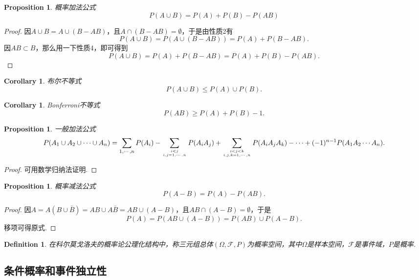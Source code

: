 \documentclass{article}
\newtheorem{corollary}[theorem]{Corollary}
\newtheorem{proposition}[theorem]{Proposition}
\newtheorem{definition}[theorem]{Definition}
\begin{document}
\begin{proposition}
\rm 概率加法公式
$$
P(A \cup B) = P(A) + P(B) - P(AB) 
$$
\end{proposition}

\begin{proof}
因$A \cup B = A \cup (B - AB)$，且$A \cap (B-AB) = \emptyset$，于是由性质2有
$$
P(A \cup B) = P(A \cup (B-AB)) = P(A) + P(B-AB).
$$
因$AB \subset B$，那么用一下性质4，即可得到
$$
P(A \cup B) = P(A) + P(B-AB) = P(A) + P(B) - P(AB).
$$
\end{proof}

\begin{corollary}
\rm 布尔不等式
$$
P(A \cup B) \leq P(A) \cup P(B).
$$
\end{corollary}

\begin{corollary}
\rm Bonferroni不等式
$$
P(AB) \geq P(A) + P(B) -1.
$$
\end{corollary}

\begin{proposition}
\rm 一般加法公式
$$
P(A_1 \cup A_2 \cup \cdots \cup A_n) = \sum\limits_{1,\cdots,n} P(A_i) - \sum\limits_{i < j \atop i,j = 1,\cdots,n}P(A_iA_j) +  \sum\limits_{i < j < k \atop i,j,k = 1,\cdots,n}P(A_iA_jA_k) - \cdots + (-1)^{n-1}P(A_1A_2\cdots A_n). 
$$
\end{proposition}

\begin{proof}
可用数学归纳法证明. 
\end{proof}

\begin{proposition}
\rm 概率减法公式 
$$
P(A - B) = P(A) - P(AB).
$$
\end{proposition}

\begin{proof}
因$A = A(B \cup \bar{B}) = AB \cup A\bar{B} = AB \cup (A-B)$，且$AB \cap (A-B) = \emptyset$，于是
$$
P(A) = P(AB \cup (A-B)) = P(AB) \cup P(A-B). 
$$
移项可得原式. 
\end{proof}

\begin{definition}
\rm 在科尔莫戈洛夫的概率论公理化结构中，称三元组总体$(\Omega,\mathscr{F}, P)$为{\color{red}概率空间}，其中$\Omega$是样本空间，$\mathscr{F}$是事件域，$P$是概率. 
\end{definition}



\newpage
\subsection{条件概率和事件独立性}
\end{document}
